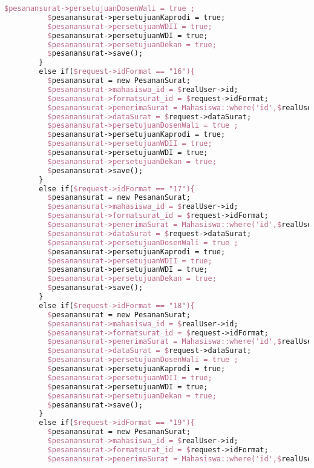 \begin{lstlisting}[language=tex,basicstyle=\tiny,caption=PesanansuratController.php]
          $pesanansurat->persetujuanDosenWali = true ;
          $pesanansurat->persetujuanKaprodi = true;
          $pesanansurat->persetujuanWDII = true;
          $pesanansurat->persetujuanWDI = true;
          $pesanansurat->persetujuanDekan = true;
          $pesanansurat->save();
        }
        else if($request->idFormat == "16"){
          $pesanansurat = new PesananSurat;
          $pesanansurat->mahasiswa_id = $realUser->id;
          $pesanansurat->formatsurat_id = $request->idFormat;
          $pesanansurat->penerimaSurat = Mahasiswa::where('id',$realUser->id)->first()->dosen->nama_dosen;
          $pesanansurat->dataSurat = $request->dataSurat;
          $pesanansurat->persetujuanDosenWali = true ;
          $pesanansurat->persetujuanKaprodi = true;
          $pesanansurat->persetujuanWDII = true;
          $pesanansurat->persetujuanWDI = true;
          $pesanansurat->persetujuanDekan = true;
          $pesanansurat->save();
        }
        else if($request->idFormat == "17"){
          $pesanansurat = new PesananSurat;
          $pesanansurat->mahasiswa_id = $realUser->id;
          $pesanansurat->formatsurat_id = $request->idFormat;
          $pesanansurat->penerimaSurat = Mahasiswa::where('id',$realUser->id)->first()->dosen->nama_dosen;
          $pesanansurat->dataSurat = $request->dataSurat;
          $pesanansurat->persetujuanDosenWali = true ;
          $pesanansurat->persetujuanKaprodi = true;
          $pesanansurat->persetujuanWDII = true;
          $pesanansurat->persetujuanWDI = true;
          $pesanansurat->persetujuanDekan = true;
          $pesanansurat->save();
        }
        else if($request->idFormat == "18"){
          $pesanansurat = new PesananSurat;
          $pesanansurat->mahasiswa_id = $realUser->id;
          $pesanansurat->formatsurat_id = $request->idFormat;
          $pesanansurat->penerimaSurat = Mahasiswa::where('id',$realUser->id)->first()->dosen->nama_dosen;
          $pesanansurat->dataSurat = $request->dataSurat;
          $pesanansurat->persetujuanDosenWali = true ;
          $pesanansurat->persetujuanKaprodi = true;
          $pesanansurat->persetujuanWDII = true;
          $pesanansurat->persetujuanWDI = true;
          $pesanansurat->persetujuanDekan = true;
          $pesanansurat->save();
        }
        else if($request->idFormat == "19"){
          $pesanansurat = new PesananSurat;
          $pesanansurat->mahasiswa_id = $realUser->id;
          $pesanansurat->formatsurat_id = $request->idFormat;
          $pesanansurat->penerimaSurat = Mahasiswa::where('id',$realUser->id)->first()->dosen->nama_dosen;

\end{lstlisting}
